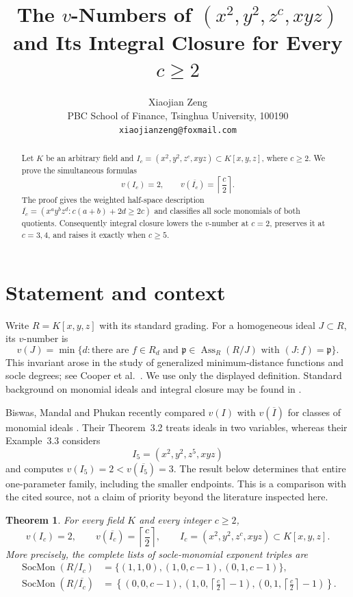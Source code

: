 \documentclass[11pt]{article}
\title{The \(v\)-Numbers of \((x^2,y^2,z^c,xyz)\) and Its Integral Closure for Every \(c\geq 2\)}
\author{Xiaojian Zeng\\
PBC School of Finance, Tsinghua University, 100190\\
\texttt{xiaojianzeng@foxmail.com}}
\date{}
\newtheorem{theorem}{Theorem}
\newcommand{\Ass}{\operatorname{Ass}}
\begin{document}
\maketitle

\begin{abstract}
Let \(K\) be an arbitrary field and
\(I_c=(x^2,y^2,z^c,xyz)\subset K[x,y,z]\), where \(c\geq2\).
We prove the simultaneous formulas
\[
  v(I_c)=2,
  \qquad
  v(\overline{I_c})=\left\lceil\frac c2\right\rceil .
\]
The proof gives the weighted half-space description
\(\overline{I_c}=(x^ay^bz^d:c(a+b)+2d\geq2c)\) and classifies all
socle monomials of both quotients.  Consequently integral closure lowers
the \(v\)-number at \(c=2\), preserves it at \(c=3,4\), and raises it
exactly when \(c\geq5\).
\end{abstract}

\section{Statement and context}

Write \(R=K[x,y,z]\) with its standard grading.  For a homogeneous ideal
\(J\subset R\), its \(v\)-number is
\[
 v(J)=\min\bigl\{d:\text{there are }f\in R_d\text{ and }
 \mathfrak p\in\Ass_R(R/J)\text{ with }(J:f)=\mathfrak p\bigr\}.
\]
This invariant arose in the study of generalized minimum-distance functions
and socle degrees; see Cooper et al.~\cite{CooperEtAl2020}.  We use only the
displayed definition.  Standard background on monomial ideals and integral
closure may be found in \cite{HerzogHibi2011,HunekeSwanson2006}.

Biswas, Mandal and Phukan recently compared \(v(I)\) with
\(v(\overline I)\) for classes of monomial ideals
\cite{BiswasMandalPhukan2026}.  Their Theorem~3.2 treats ideals in two
variables, whereas their Example~3.3 considers
\[
  I_5=(x^2,y^2,z^5,xyz)
\]
and computes \(v(I_5)=2<v(\overline{I_5})=3\).  The result below determines
that entire one-parameter family, including the smaller endpoints.  This is
a comparison with the cited source, not a claim of priority beyond the
literature inspected here.

\begin{theorem}\label{thm:main}
For every field \(K\) and every integer \(c\geq2\),
\[
 v(I_c)=2,
 \qquad
 v(\overline{I_c})=\left\lceil\frac c2\right\rceil,
 \qquad
 I_c=(x^2,y^2,z^c,xyz)\subset K[x,y,z].
\]
More precisely, the complete lists of socle-monomial exponent triples are
\begin{align*}
 \operatorname{SocMon}(R/I_c)
   &=\{(1,1,0),(1,0,c-1),(0,1,c-1)\},\\
 \operatorname{SocMon}(R/\overline{I_c})
   &=\left\{(0,0,c-1),
       \left(1,0,\left\lceil\frac c2\right\rceil-1\right),
       \left(0,1,\left\lceil\frac c2\right\rceil-1\right)\right\}.
\end{align*}
\end{theorem}
\end{document}
